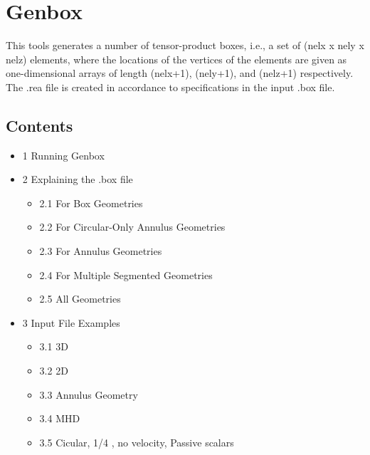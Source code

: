 

\section{
  Genbox
}



\par This tools generates a number of tensor-product boxes, i.e., a set of (nelx x nely x nelz) elements, where the locations of the vertices of the elements are given as one-dimensional arrays of length (nelx+1), (nely+1), and (nelz+1) respectively.  The .rea file is created in accordance to specifications in the input .box file.

\subsection{Contents}
\begin{itemize}
  \item 1 Running Genbox
  \item 2 Explaining the .box file
    \begin{itemize}
      \item 2.1 For Box Geometries
      \item 2.2 For Circular-Only Annulus Geometries
      \item 2.3 For Annulus Geometries
      \item 2.4 For Multiple Segmented Geometries
      \item 2.5 All Geometries
    \end{itemize}

  \item 3 Input File Examples
    \begin{itemize}
      \item 3.1 3D
      \item 3.2 2D
      \item 3.3 Annulus Geometry
      \item 3.4 MHD
      \item 3.5 Cicular, 1/4 , no velocity, Passive scalars
    \end{itemize}

\end{itemize}

